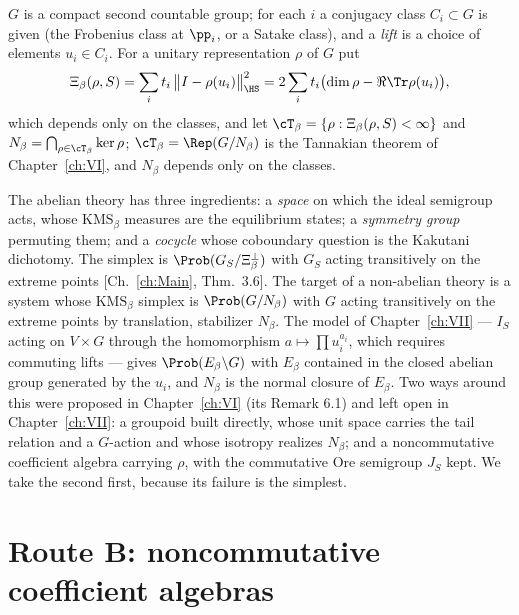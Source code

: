$G$ is a compact second countable group; for each $i$ a conjugacy class $C_i\subset G$ is
given (the Frobenius class at $\pp_i$, or a Satake class), and a \emph{lift} is a choice of
elements $u_i\in C_i$. For a unitary representation $\rho$ of $G$ put
\begin{equation}\label{XXVII:eq:Xi}
\Xi_\beta(\rho,S)=\sum_i t_i\,\bigl\|I-\rho(u_i)\bigr\|_{\HS}^2
=2\sum_it_i\bigl(\dim\rho-\Re\Tr\rho(u_i)\bigr),
\end{equation}
which depends only on the classes, and let $\cT_\beta=\{\rho:\Xi_\beta(\rho,S)<\infty\}$ and
$N_\beta=\bigcap_{\rho\in\cT_\beta}\ker\rho$; $\cT_\beta=\Rep(G/N_\beta)$ is the Tannakian
theorem of Chapter~\ref{ch:VI}, and $N_\beta$ depends only on the classes.

The abelian theory has three ingredients: a \emph{space} on which the ideal semigroup acts,
whose $\mathrm{KMS}_\beta$ measures are the equilibrium states; a \emph{symmetry group}
permuting them; and a \emph{cocycle} whose coboundary question is the Kakutani dichotomy.
The simplex is $\Prob(G_S/\Xi_\beta^\perp)$ with $G_S$ acting transitively on the extreme
points [Ch.~\ref{ch:Main}, Thm.~3.6]. The target of a non-abelian theory is a system whose
$\mathrm{KMS}_\beta$ simplex is $\Prob(G/N_\beta)$ with $G$ acting transitively on the
extreme points by translation, stabilizer $N_\beta$. The model of Chapter~\ref{ch:VII} --- $I_S$
acting on $V\times G$ through the homomorphism $a\mapsto\prod u_i^{a_i}$, which requires
commuting lifts --- gives $\Prob(E_\beta\backslash G)$ with $E_\beta$ contained in the closed
abelian group generated by the $u_i$, and $N_\beta$ is the normal closure of $E_\beta$.
Two ways around this were proposed in Chapter~\ref{ch:VI} (its Remark 6.1) and left open in Chapter~\ref{ch:VII}:
a groupoid built directly, whose unit space carries the tail relation and a $G$-action and
whose isotropy realizes $N_\beta$; and a noncommutative coefficient algebra carrying
$\rho$, with the commutative Ore semigroup $J_S$ kept. We take the second first, because
its failure is the simplest.

\section{Route B: noncommutative coefficient algebras}\label{XXVII:sec:B}

